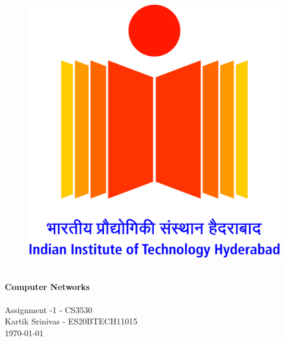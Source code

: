 \begin{titlepage}
    \vbox{ }

    \vbox{ }

    \begin{center}
        \begin{figure}
            \centering
            \includegraphics[scale=0.1]{img/logo.jpg}
            \label{fig:my_label}
        \end{figure}
        

        \noindent\makebox[\linewidth]{\rule{.7\paperwidth}{.6pt}}\\[0.7cm]
        { \huge \bfseries Computer Networks}\\[0.25cm]
        \noindent\makebox[\linewidth]{\rule{.7\paperwidth}{.6pt}}\\[0.7cm]
        \large{Assignment -1 - CS3530}\\[1.2cm]
        \vfill
        \large
        Kartik Srinivas - ES20BTECH11015\\
            {\large \today}
    \end{center}
\end{titlepage}